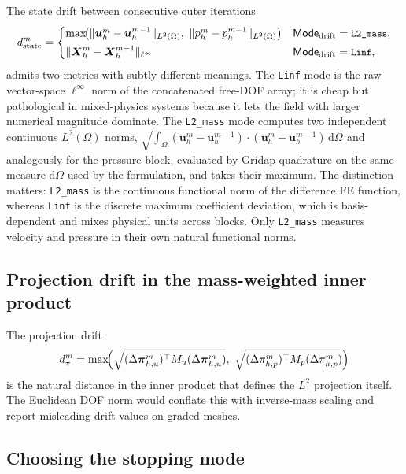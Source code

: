 \documentclass{article}
\newcommand{\code}[1]{\texttt{\small #1}}
\begin{document}
The state drift between consecutive outer iterations
\begin{equation}
    d_{\mathrm{state}}^m
    = \begin{cases}
        \max\!\bigl(
            \|\boldsymbol{u}_h^m - \boldsymbol{u}_h^{m-1}\|_{L^2(\Omega)},\
            \|p_h^m - p_h^{m-1}\|_{L^2(\Omega)} \bigr)
            & \mathsf{Mode}_{\mathrm{drift}} = \code{L2\_mass}, \\[1mm]
        \|\boldsymbol{X}_h^m - \boldsymbol{X}_h^{m-1}\|_{\ell^\infty}
            & \mathsf{Mode}_{\mathrm{drift}} = \code{Linf},
    \end{cases}
\end{equation}
admits two metrics with subtly different meanings. The \code{Linf}
mode is the raw vector-space $\ell^\infty$ norm of the concatenated
free-DOF array; it is cheap but pathological in mixed-physics systems
because it lets the field with larger numerical magnitude dominate.
The \code{L2\_mass} mode computes two independent continuous
$L^2(\Omega)$ norms,
$\sqrt{\int_\Omega (\boldsymbol{u}_h^m - \boldsymbol{u}_h^{m-1})\cdot(\boldsymbol{u}_h^m - \boldsymbol{u}_h^{m-1})\,\mathrm{d}\Omega}$
and analogously for the pressure block, evaluated by Gridap quadrature
on the same measure $\mathrm{d}\Omega$ used by the formulation, and
takes their maximum. The distinction matters: \code{L2\_mass} is the
continuous functional norm of the difference FE function, whereas
\code{Linf} is the discrete maximum coefficient deviation, which is
basis-dependent and mixes physical units across blocks. Only
\code{L2\_mass} measures velocity and pressure in their own natural
functional norms.

\subsection{Projection drift in the mass-weighted inner product}
\label{sec:proj-drift}

The projection drift
\begin{equation}
    d_\pi^m
    = \max\!\Bigl(
        \sqrt{(\Delta\boldsymbol{\pi}_{h,u}^m)^\top M_u (\Delta\boldsymbol{\pi}_{h,u}^m)},\
        \sqrt{(\Delta\pi_{h,p}^m)^\top M_p (\Delta\pi_{h,p}^m)} \Bigr)
\end{equation}
is the natural distance in the inner product that defines the $L^2$
projection itself. The Euclidean DOF norm would conflate this with
inverse-mass scaling and report misleading drift values on graded
meshes.

\subsection{Choosing the stopping mode}
\label{sec:stopping-mode}
\end{document}
